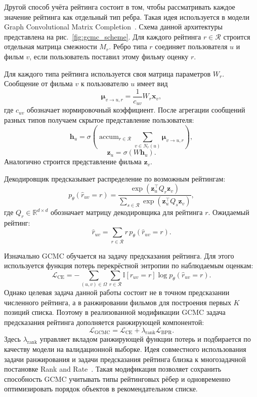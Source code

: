 \documentclass[12pt,fleqn]{article}
\begin{document}
Другой способ учёта рейтинга состоит в том, чтобы рассматривать каждое значение
рейтинга как отдельный тип ребра. Такая идея используется в модели Graph
Convolutional Matrix Completion~\cite{vandenberg2017gcmc}. Схема данной
архитектуры представлена на рис.~\ref{fig:gcmc_scheme}. Для каждого рейтинга
$r\in\mathcal{R}$ строится отдельная матрица смежности $M_r$. Ребро типа $r$
соединяет пользователя $u$ и фильм $v$, если пользователь поставил этому
фильму оценку $r$.

Для каждого типа рейтинга используется своя матрица параметров $W_r$.
Сообщение от фильма $v$ к пользователю $u$ имеет вид
$$
    \boldsymbol{\mu}_{v\to u,r}=
    \frac{1}{c_{uv}}
    W_r\mathbf{x}_v,
$$
где $c_{uv}$ обозначает нормировочный коэффициент. После агрегации сообщений
разных типов получаем скрытое представление пользователя:
$$
    \mathbf{h}_u=
    \sigma\left(
        \operatorname{accum}_{r\in\mathcal{R}}
        \sum_{v\in N_r(u)}
        \boldsymbol{\mu}_{v\to u,r}
    \right),
$$
$$
    \mathbf{z}_u=
    \sigma(W\mathbf{h}_u).
$$
Аналогично строится представление фильма $\mathbf{z}_v$.

Декодировщик предсказывает распределение по возможным рейтингам:
$$
    p_{\theta}(\hat r_{uv}=r)=
    \frac{
        \exp\left(
            \mathbf{z}_u^{\top}
            Q_r
            \mathbf{z}_v
        \right)
    }{
        \sum\limits_{s\in\mathcal{R}}
        \exp\left(
            \mathbf{z}_u^{\top}
            Q_s
            \mathbf{z}_v
        \right)
    },
$$
где $Q_r\in\mathbb{R}^{d\times d}$ обозначает матрицу декодировщика для рейтинга $r$.
Ожидаемый рейтинг:
$$
    \hat r_{uv}=
    \sum_{r\in\mathcal{R}}
    r\,
    p_{\theta}(\hat r_{uv}=r).
$$

Изначально GCMC обучается на задачу предсказания рейтинга. Для этого
используется функция потерь перекрёстной энтропии по наблюдаемым оценкам:
$$
    \mathcal{L}_{\mathrm{CE}}=
    -
    \sum_{(u,v)\in\Omega}
    \sum_{r\in\mathcal{R}}
    \mathbb{I}[r_{uv}=r]
    \log p_{\theta}(\hat r_{uv}=r).
$$
Однако целевая задача данной работы состоит не в точном предсказании численного
рейтинга, а в ранжировании фильмов для построения первых $K$ позиций списка.
Поэтому в реализованной модификации GCMC задача предсказания рейтинга
дополняется ранжирующей компонентой:
$$
    \mathcal{L}_{\mathrm{GCMC}}=
    \mathcal{L}_{\mathrm{CE}}
    +
    \lambda_{\mathrm{rank}}
    \mathcal{L}_{\mathrm{BPR}}.
$$
Здесь $\lambda_{\mathrm{rank}}$ управляет вкладом ранжирующей функции потерь и
подбирается по качеству модели на валидационной выборке. Идея совместного
использования задачи ранжирования и задачи предсказания рейтинга близка к
многозадачной постановке Rank and Rate~\cite{hadash2018rankrate}. Такая
модификация позволяет сохранить способность GCMC учитывать типы рейтинговых
рёбер и одновременно оптимизировать порядок объектов в рекомендательном списке.
\end{document}
